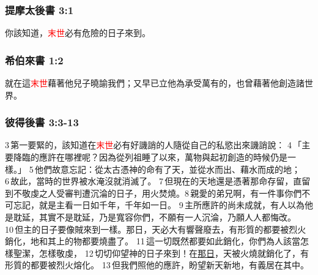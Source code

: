 \subsubsection{提摩太後書 3:1}
你該知道，\textcolor{red}{末世}必有危險的日子來到。

\subsubsection{希伯來書 1:2}
就在這\textcolor{red}{末世}藉著他兒子曉諭我們；又早已立他為承受萬有的，也曾藉著他創造諸世界。


\subsubsection{彼得後書 3:3-13}
 3 第一要緊的，該知道在\textcolor{red}{末世}必有好譏誚的人隨從自己的私慾出來譏誚說： 4 「主要降臨的應許在哪裡呢？因為從列祖睡了以來，萬物與起初創造的時候仍是一樣。」 5 他們故意忘記：從太古憑神的命有了天，並從水而出、藉水而成的地； 6 故此，當時的世界被水淹沒就消滅了。 7 但現在的天地還是憑著那命存留，直留到不敬虔之人受審判遭沉淪的日子，用火焚燒。8 親愛的弟兄啊，有一件事你們不可忘記，就是主看一日如千年，千年如一日。 9 主所應許的尚未成就，有人以為他是耽延，其實不是耽延，乃是寬容你們，不願有一人沉淪，乃願人人都悔改。 10 但主的日子要像賊來到一樣。那日，天必大有響聲廢去，有形質的都要被烈火銷化，地和其上的物都要燒盡了。 11 這一切既然都要如此銷化，你們為人該當怎樣聖潔，怎樣敬虔， 12 切切仰望神的日子來到！在\underline{那日}，天被火燒就銷化了，有形質的都要被烈火熔化。 13 但我們照他的應許，盼望新天新地，有義居在其中。


 


